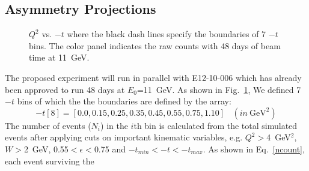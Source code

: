 \subsection{Asymmetry Projections}
\begin{figure}[!ht]
 \begin{center}
   \caption[$Q^{2}$ vs. $-t$]{\footnotesize{$Q^{2}$ vs. $-t$ where the black
       dash lines specify the boundaries of 7 $-t$ bins. The color panel
       indicates the raw counts with 48 days of beam time at 11~GeV.}}
  \label{Q2_t_bin}
  \end{center}
\end{figure}
The proposed experiment will run in parallel with E12-10-006 which has already
been approved to run 48 days at $E_{0}$=11~GeV.  As shown in
Fig.~\ref{Q2_t_bin}, We defined 7 $-t$ bins of which the the boundaries are
defined by the array:
 \begin{equation}
   -t[8] = [0.0, 0.15, 0.25, 0.35, 0.45, 0.55, 0.75, 1.10]~~~~(in~\mathrm{GeV^{2}})
 \end{equation}
The number of events ($N_{i}$) in the $i$th bin is calculated from the total
simulated events after applying cuts on important kinematic variables,
e.g. $Q^{2}>$4~GeV$^{2}$, $W>$2~GeV, 0.55$<\epsilon<$0.75 and
$-t_{min}<-t<-t_{max}$. As shown in Eq.~\ref{ncount}, each event surviving the

